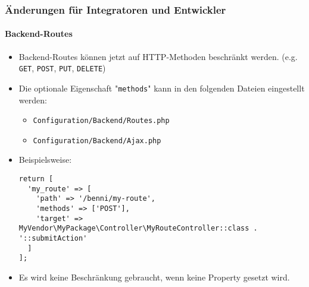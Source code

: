 %

\begin{frame}[fragile]
	\frametitle{Änderungen für Integratoren und Entwickler}
	\framesubtitle{Backend-Routes}


	\begin{itemize}
		\item Backend-Routes können jetzt auf HTTP-Methoden beschränkt werden.\newline
			\small(e.g. \texttt{GET}, \texttt{POST}, \texttt{PUT}, \texttt{DELETE})
		\item Die optionale Eigenschaft "\texttt{methods}" kann in den folgenden Dateien eingestellt werden:
			\begin{itemize}\smaller
				\item \texttt{Configuration/Backend/Routes.php}
				\item \texttt{Configuration/Backend/Ajax.php}
			\end{itemize}
			\vspace{0.2cm}
		\item Beispielsweise:
\begin{lstlisting}
return [
  'my_route' => [
    'path' => '/benni/my-route',
    'methods' => ['POST'],
    'target' => MyVendor\MyPackage\Controller\MyRouteController::class . '::submitAction'
  ]
];
\end{lstlisting}

		\item Es wird keine Beschränkung gebraucht, wenn keine Property gesetzt wird.

	\end{itemize}

\end{frame}

